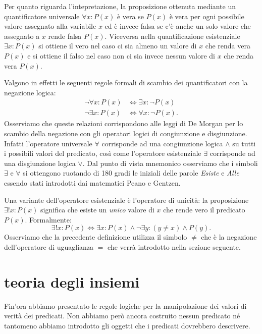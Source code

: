 \documentclass[italian,a4paper,twosides,headinclude]{scrbook}
\begin{document}
Per quanto riguarda l'intepretazione,
la proposizione ottenuta mediante un quantificatore universale
$\forall x\colon P(x)$ è vera se $P(x)$ è vera per ogni possibile valore
assegnato alla variabile $x$ ed è invece falsa se c'è anche un solo valore che
assegnato a $x$ rende falsa $P(x)$. Viceversa nella quantificazione
esistenziale $\exists x\colon P(x)$ si ottiene il vero nel caso ci sia almeno
un valore di $x$ che renda vera $P(x)$ e si ottiene il falso nel caso non ci sia
invece nessun valore di $x$ che renda vera $P(x)$.

Valgono in effetti le seguenti regole formali di scambio dei quantificatori con
la negazione logica:
\begin{align*}
  \neg \forall x \colon P(x) &\iff \exists x \colon \neg P(x)\\
  \neg \exists x \colon P(x) &\iff \forall x \colon \neg P(x).
\end{align*}
Osserviamo che queste relazioni corrispondono alle leggi di De Morgan per lo
scambio della negazione con gli operatori logici di congiunzione e disgiunzione.
Infatti l'operatore universale $\forall$ corrisponde ad una congiunzione logica
$\wedge$ su tutti i possibili valori del predicato,
così come l'operatore esistenziale
$\exists$ corrisponde ad una disgiunzione logica $\vee$.
Dal punto di vista mnemonico osserviamo che i simboli $\exists$ e $\forall$
si ottengono ruotando di 180 gradi le iniziali delle parole
\emph{Esiste} e \emph{Alle} essendo stati introdotti dai matematici Peano e Gentzen.

Una variante dell'operatore esistenziale è l'operatore di unicità:
la proposizione $\exists! x\colon P(x)$ significa che esiste un \emph{unico} valore di $x$
che rende vero il predicato $P(x)$. Formalmente:
\[
  \exists!x\colon P(x) \iff \exists x\colon P(x)
  \wedge \neg \exists y\colon (y \neq x) \wedge P(y).
\]
Osserviamo che la precedente definizione utilizza il simbolo $\neq$ che è la
negazione dell'operatore di uguaglianza $=$ che verrà introdotto nella sezione
seguente.

\section{teoria degli insiemi}

Fin'ora abbiamo presentato le regole logiche per la manipolazione dei valori di
verità dei predicati. Non abbiamo però ancora costruito nessun predicato né
tantomeno abbiamo introdotto gli oggetti che i predicati dovrebbero descrivere.
\end{document}
